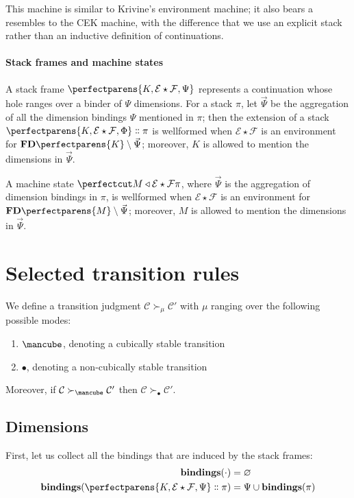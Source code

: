 \documentclass{article}
\newcommand\StackBindings[1]{\mathbf{bindings} (#1)}
\newcommand\Env[2]{#1\star{#2}}
\newcommand\Clo[3]{#1\triangleleft{\Env{#2}{#3}}}
\newcommand\Cons[2]{{#1}\dblcolon{#2}}
\newcommand\FreeDims[1]{\mathbf{FD}\perfectparens{#1}}
\newcommand\Frame[4]{\perfectparens{#1,\Env{#2}{#3},#4}}
\newcommand\Cfg[4]{\cut{\Clo{#1}{#2}{#3}}{#4}}
\newcommand\Stable{\text{\mancube}}
\newcommand\NonStable{\bullet}
\newcommand\Step[3]{{#2}\mathrel{\succ_{#1}}{#3}}
\begin{document}
This machine is similar to Krivine's environment machine; it also
bears a resembles to the CEK machine, with the difference that we use
an explicit stack rather than an inductive definition of
continuations.

\paragraph{Stack frames and machine states}

A stack frame $\Frame{K}{\mathcal{E}}{\mathcal{F}}{\Psi}$ represents a continuation
whose hole ranges over a binder of $\Psi$ dimensions. For a stack
$\pi$, let $\vec{\Psi}$ be the aggregation of all the dimension
bindings $\Psi$ mentioned in $\pi$; then the extension of a stack
$\Cons{\Frame{K}{\mathcal{E}}{\mathcal{F}}{\Phi}}{\pi}$ is wellformed when
$\Env{\mathcal{E}}{\mathcal{F}}$ is an environment for $\FreeDims{K}\setminus\vec{\Psi}$;
moreover, $K$ is allowed to mention the dimensions in $\vec{\Psi}$.

A machine state $\Cfg{M}{\mathcal{E}}{\mathcal{F}}{\pi}$, where $\vec{\Psi}$ is the
aggregation of dimension bindings in $\pi$, is wellformed when
$\Env{\mathcal{E}}{\mathcal{F}}$ is an environment for $\FreeDims{M}\setminus\vec{\Psi}$;
moreover, $M$ is allowed to mention the dimensions in $\vec{\Psi}$.

\section{Selected transition rules}

We define a transition judgment
$\Step{\mu}{\mathcal{C}}{\mathcal{C}'}$ with $\mu$ ranging over
the following possible modes:
\begin{enumerate}
\item $\Stable$, denoting a cubically stable transition
\item $\NonStable$, denoting a non-cubically stable transition
\end{enumerate}

Moreover, if $\Step{\Stable}{\mathcal{C}}{\mathcal{C}'}$ then
$\Step{\NonStable}{\mathcal{C}}{\mathcal{C}'}$.

\subsection{Dimensions}

First, let us collect all the bindings that are induced by the stack
frames:
\begin{align*}
  \StackBindings{\cdot} &= \varnothing\\
  \StackBindings{\Cons{\Frame{K}{\mathcal{E}}{\mathcal{F}}{\Psi}}{\pi}} &= \Psi\cup\StackBindings{\pi}
\end{align*}
\end{document}
